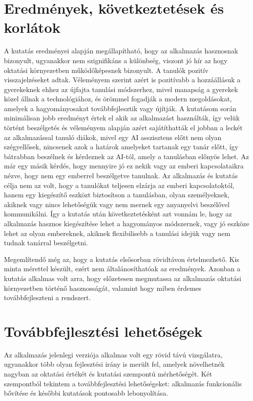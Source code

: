 \newpage

\section{Eredmények, következtetések és korlátok}

A kutatás eredményei alapján megállapítható, hogy az alkalmazás hasznosnak bizonyult, ugyanakkor nem szignifikáns a különbség, viszont jó hír az hogy oktatási környezetben működőképesnek bizonyult. A tanulók pozitív visszajelzéseket adtak. Véleményem szerint azért is pozitívabb a hozzáállásuk a gyerekeknek ehhez az újfajta tanulási módszerhez, mivel manapság a gyerekek közel állnak a technológiához, és örömmel fogadják a modern megoldásokat, amelyek a hagyományosakat továbbfejlesztik vagy újítják. A kutatásom során minimálisan jobb eredményt értek el akik az alkalmazást használták, így velük történt beszélgetés és véleményem alapján azért sajátíthatták el jobban a leckét az alkalmazással tanuló diákok, mivel egy AI asszisztens előtt nem olyan szégyellősek, nincsenek azok a határok amelyeket tartanak egy tanár előtt, így bátrabban beszélnek és kérdeznek az AI-tól, amely a tanulásban előnyös lehet. Az már egy másik kérdés, hogy mennyire jó ez nekik vagy az emberi kapcsolataikra nézve, hogy nem egy emberrel beszélgetve tanulnak. Az alkalmazás és kutatás célja nem az volt, hogy a tanulókat teljesen elzárja az emberi kapcsolatoktól, hanem egy kiegészítő eszközt biztosítson a tanulásban, olyan személyeknek, akiknek vagy nincs lehetőségük vagy nem mernek egy anyanyelvi beszélővel kommunikálni. Így a kutatás után következtetésként azt vonnám le, hogy az alkalmazás hasznos kiegészítése lehet a hagyományos módszernek, vagy jó eszköze lehet az olyan embereknek, akiknek flexibilisebb a tanulási idejük vagy nem tudnak tanárral beszélgetni.

Megemlítendő még az, hogy a kutatás elsősorban rövidtávon értelmezhető. Kis minta mérettel készült, ezért nem általánosíthatóak az eredmények. Azonban a kutatás alkalmas volt arra, hogy előzetesen megmutassa az alkalmazás oktatási környezetben történő hasznosságát, valamint hogy miben érdemes továbbfejleszteni a rendszert.

\section{Továbbfejlesztési lehetőségek}

Az alkalmazás jelenlegi verziója alkalmas volt egy rövid távú vizsgálatra, ugyanakkor több olyan fejlesztési irány is merült fel, amelyek növelhetnék nagyban az oktatási értékét és kutatási szempontú mérhetőségét. Két szempontból tekintem a továbbfejlesztési lehetőségeket: alkalmazás funkcionális bővítése és későbbi kutatások pontosabb lebonyolítása.

